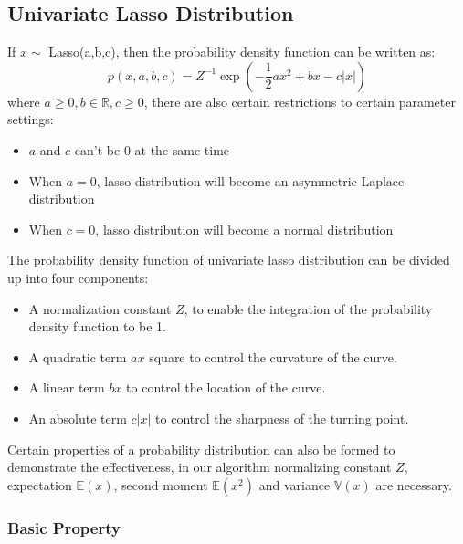 \subsection{Univariate Lasso Distribution}
If $x \sim $ Lasso(a,b,c), then the probability density function can be written as:
\begin{equation}
	p(x,a,b,c) = Z^{-1}\exp(-\frac{1}{2}ax^2+bx-c|x|)
\end{equation}
where $a \geq 0, b \in \mathbb{R}, c \geq 0$, there are also certain restrictions to certain parameter settings:
\begin{itemize}
	\item $a$ and $c$ can't be 0 at the same time
	\item When $a = 0$, lasso distribution will become an asymmetric Laplace distribution
	\item When $c = 0$, lasso distribution will become a normal distribution
\end{itemize}
The probability density function of univariate lasso distribution can be divided up into four components:
\begin{itemize}
	\item A normalization constant $Z$, to enable the integration of the probability density function to be 1.
	\item A quadratic term $ax$ square to control the curvature of the curve.
	\item A linear term $bx$ to control the location of the curve.
	\item An absolute term $c|x|$ to control the sharpness of the turning point.
\end{itemize} 
Certain properties of a probability distribution can also be formed to demonstrate the effectiveness, in our algorithm normalizing constant $Z$, expectation $\mathbb{E}(x)$, second moment $\mathbb{E}(x^2)$ and variance $\mathbb{V}(x)$ are necessary.

\subsubsection{Basic Property}
